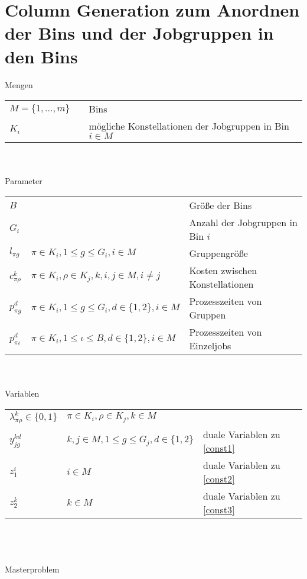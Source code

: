 \documentclass{article}
\begin{document}
\section*{Column Generation zum Anordnen der Bins und der Jobgruppen in den Bins}
Mengen\\
\begin{tabular}{lll}
    $M=\{1,\dots,m\}$ & & Bins \\
    $K_i$ & & mögliche Konstellationen der Jobgruppen in Bin $i\in M$
\end{tabular}%
\\
\\
Parameter\\
\begin{tabular}{lll}
    $B$ & & Größe der Bins\\
    $G_i$ & & Anzahl der Jobgruppen in Bin $i$ \\
    $l_{\pi g}$ & $\pi\in K_i, 1\leq g\leq G_i, i\in M$ & Gruppengröße \\
    $c_{\pi\rho}^k$ & $\pi\in K_i,\rho\in K_j, k\!,\!i\!,\!j\in M, i\neq j$ & Kosten zwischen Konstellationen \label{c} \\
    $p_{\pi g}^d$ & $\pi\in K_i,1\leq g\leq G_i, d\in\{1,2\}, i\in M$ & Prozesszeiten von Gruppen \\
    $p_{\pi \iota}^d$ & $\pi\in K_i,1\leq \iota\leq B, d\in\{1,2\}, i\in M$ & Prozesszeiten von Einzeljobs
\end{tabular}%
\\
\\
Variablen\\
\begin{tabular}{lll}
    $\lambda_{\pi\rho}^k\in\{0,1\}$ & $\pi\in K_i,\rho\in K_j,k\in M$  & \\
    $y_{jg}^{kd}$ & $k,j\in M, 1\leq g\leq G_j, d\in\{1,2\}$ & duale Variablen zu \ref{const1} \\
    $z_1^i$ & $i\in M$ & duale Variablen zu \ref{const2} \\
    $z_2^k$ & $k\in M$ & duale Variablen zu \ref{const3}
\end{tabular}
\\
\\
\\
%
Masterproblem\\
\end{document}
